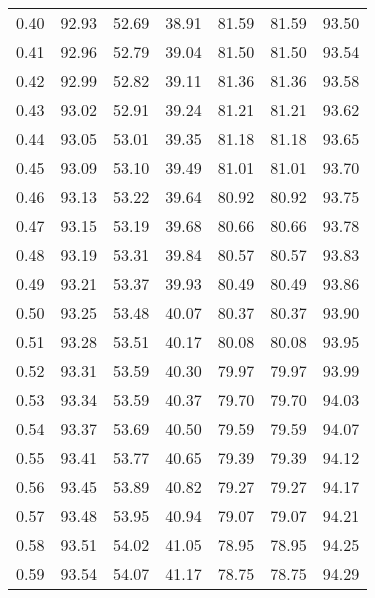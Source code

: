 \begin{tabular}{|c|c|c|c|c|c|c|}
      0.40 &     92.93 &     52.69 &      38.91 &   81.59 &      81.59 &         93.50 \\
      0.41 &     92.96 &     52.79 &      39.04 &   81.50 &      81.50 &         93.54 \\
      0.42 &     92.99 &     52.82 &      39.11 &   81.36 &      81.36 &         93.58 \\
      0.43 &     93.02 &     52.91 &      39.24 &   81.21 &      81.21 &         93.62 \\
      0.44 &     93.05 &     53.01 &      39.35 &   81.18 &      81.18 &         93.65 \\
      0.45 &     93.09 &     53.10 &      39.49 &   81.01 &      81.01 &         93.70 \\
      0.46 &     93.13 &     53.22 &      39.64 &   80.92 &      80.92 &         93.75 \\
      0.47 &     93.15 &     53.19 &      39.68 &   80.66 &      80.66 &         93.78 \\
      0.48 &     93.19 &     53.31 &      39.84 &   80.57 &      80.57 &         93.83 \\
      0.49 &     93.21 &     53.37 &      39.93 &   80.49 &      80.49 &         93.86 \\
      0.50 &     93.25 &     53.48 &      40.07 &   80.37 &      80.37 &         93.90 \\
      0.51 &     93.28 &     53.51 &      40.17 &   80.08 &      80.08 &         93.95 \\
      0.52 &     93.31 &     53.59 &      40.30 &   79.97 &      79.97 &         93.99 \\
      0.53 &     93.34 &     53.59 &      40.37 &   79.70 &      79.70 &         94.03 \\
      0.54 &     93.37 &     53.69 &      40.50 &   79.59 &      79.59 &         94.07 \\
      0.55 &     93.41 &     53.77 &      40.65 &   79.39 &      79.39 &         94.12 \\
      0.56 &     93.45 &     53.89 &      40.82 &   79.27 &      79.27 &         94.17 \\
      0.57 &     93.48 &     53.95 &      40.94 &   79.07 &      79.07 &         94.21 \\
      0.58 &     93.51 &     54.02 &      41.05 &   78.95 &      78.95 &         94.25 \\
      0.59 &     93.54 &     54.07 &      41.17 &   78.75 &      78.75 &         94.29 \\

\end{tabular}

